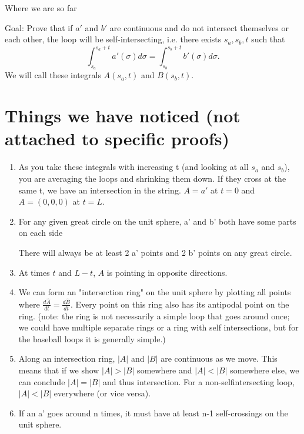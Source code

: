 \documentclass[12pt]{article}
\begin{document}
\begin{center}
    Where we are so far
\end{center}

Goal: Prove that if $a'$ and $b'$ are continuous and do not intersect themselves or each other, the loop will be self-intersecting, i.e. there exists $s_a, s_b,t$ such that $$\int_{s_a}^{s_a+t} a'(\sigma) d\sigma = \int_{s_b}^{s_b+t} b'(\sigma) d\sigma.$$ We will call these integrals $A(s_a,t)$ and $B(s_b,t)$.

\bigskip

\section{Things we have noticed (not attached to specific proofs)}

\begin{enumerate}

\item As you take these integrals with increasing t (and looking at all $s_a$ and $s_b$), you are averaging the loops and shrinking them down. If they cross at the same t, we have an intersection in the string.
$A = a'$ at $t=0$ and $A=(0,0,0)$ at $t=L$.

\item For any given great circle on the unit sphere, a' and b' both have some parts on each side

There will always be at least 2 a' points and 2 b' points on any great circle.

\item At times $t$ and $L-t$, $A$ is pointing in opposite directions.

\item We can form an "intersection ring" on the unit sphere by plotting all points where $\frac{d\hat{A}}{dt} = \frac{d\hat{B}}{dt}$. Every point on this ring also has its antipodal point on the ring. (note: the ring is not necessarily a simple loop that goes around once; we could have multiple separate rings or a ring with self intersections, but for the baseball loops it is generally simple.)

\item Along an intersection ring, $|A|$ and $|B|$ are continuous as we move. This means that if we show $|A| > |B|$ somewhere and $|A| < |B|$ somewhere else, we can conclude $|A| = |B|$ and thus intersection. For a non-selfintersecting loop, $|A| < |B|$ everywhere (or vice versa).

\item If an a' goes around n times, it must have at least n-1 self-crossings on the unit sphere.


\end{enumerate}
\end{document}
